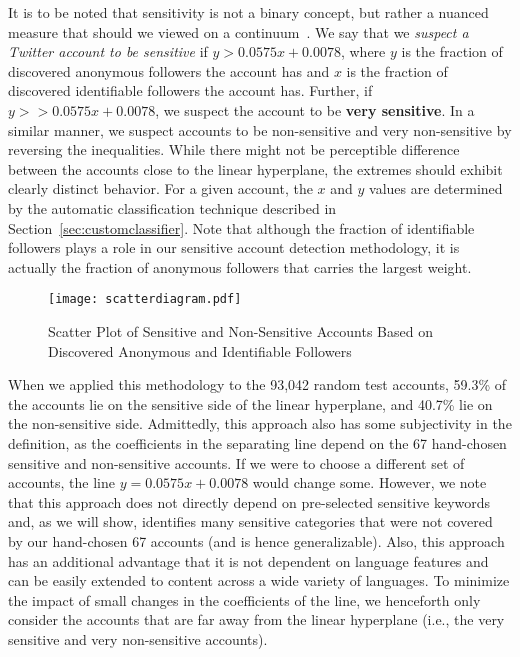 \documentclass[conference]{IEEEtran}
\begin{document}
It is to be noted that sensitivity is not a binary concept, but rather a nuanced measure that should we viewed on a continuum~\cite{Peddinti2014,correa2015whisper}.
We say that we {\em suspect a Twitter account to be sensitive} if  $y > 0.0575x + 0.0078$, where $y$ is the fraction of 
discovered anonymous followers the account has and $x$ is the fraction of discovered identifiable followers the account has. Further, if $y >> 0.0575x + 0.0078$, we suspect the account to be {\bf very sensitive}. In a similar manner, we suspect accounts to be non-sensitive and very non-sensitive by reversing the inequalities. While there might not be perceptible difference between the accounts close to the linear hyperplane, the extremes should exhibit clearly distinct behavior. For a given account, the $x$ and $y$ values
are determined by the automatic classification technique described in Section~\ref{sec:customclassifier}. Note that although the fraction of identifiable followers plays a role in our sensitive account detection methodology, it is actually the fraction of anonymous followers that carries the largest weight.  

\begin{figure}[thb]
\begin{center}
  \centering
    \caption{Scatter Plot of Sensitive and Non-Sensitive Accounts Based on Discovered Anonymous and Identifiable Followers}
  \label{fig:svmscatterdiagram}
     \texttt{[image: scatterdiagram.pdf]}
\end{center}
\end{figure}

When we applied this methodology to the 93,042 random test accounts, 59.3\% of the accounts lie on the sensitive side of the linear hyperplane, and 40.7\% lie on the non-sensitive side. Admittedly, this approach also has some subjectivity in the definition, as the coefficients in the separating line depend
on the 67 hand-chosen sensitive and non-sensitive accounts.  If we were to choose a different set of accounts, the line $y = 0.0575x + 0.0078$ would change some. However, we note that this approach does not directly depend on pre-selected sensitive keywords and, as we will show,  identifies many sensitive categories that were not covered by our hand-chosen 67 accounts (and is hence generalizable). Also, this approach has an additional advantage that it is not dependent on language features and can be easily extended to content across a wide variety of languages. To minimize the impact of small changes in the coefficients of the line, 
we henceforth only consider the accounts that are far away from the linear hyperplane (i.e., the very sensitive and very non-sensitive accounts).
\end{document}
